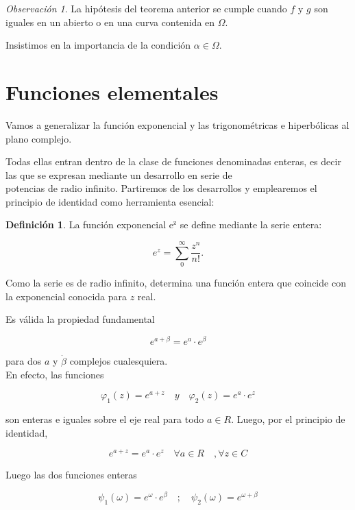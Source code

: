 \documentclass[10pt]{article}
\theoremstyle{plain}
\theoremstyle{definition}
\newtheorem{definition}[theorem]{Definición}
\theoremstyle{remark}
\newtheorem{remark}[theorem]{Observación}
\begin{document}
\begin{remark}
La hipótesis del teorema anterior se cumple cuando $f$ y $g$ son iguales en un abierto o en una curva contenida en $\Omega$.
\end{remark}


Insistimos en la importancia de la condición $\alpha \in \Omega$.

\section{Funciones elementales}
Vamos a generalizar la función exponencial y las trigonométricas e hiperbólicas al plano complejo.

Todas ellas entran dentro de la clase de funciones denominadas enteras, es decir las que se expresan mediante un desarrollo en serie de\\
potencias de radio infinito. Partiremos de los desarrollos y emplearemos el principio de identidad como herramienta esencial:

\begin{definition}
  La función exponencial $\mathrm{e}^{\mathrm{z}}$ se define mediante la serie entera:

  \begin{equation*}
  e^{z}=\sum_{0}^{\infty} \frac{z^{n}}{n!} . \tag{12-1}
  \end{equation*}
\end{definition}

Como la serie es de radio infinito, determina una función entera que coincide con la exponencial conocida para $z$ real.

Es válida la propiedad fundamental


\begin{equation*}
e^{a+\beta}=e^{a} \cdot e^{\beta} \tag{12-2}
\end{equation*}


para dos $a$ y $\dot{\beta}$ complejos cualesquiera.\\
En efecto, las funciones

$$
\varphi_{1}(z)=e^{a+z} \quad y \quad \varphi_{2}(z)=e^{a} \cdot e^{z}
$$

son enteras e iguales sobre el eje real para todo $a \in R$. Luego, por el principio de identidad,

$$
e^{a+z}=e^{a} \cdot e^{z} \quad \forall a \in R \quad, \forall z \in C
$$

Luego las dos funciones enteras

$$
\psi_{1}(\omega)=e^{\omega} \cdot e^{\beta} \quad ; \quad \psi_{2}(\omega)=e^{\omega+\beta}
$$
\end{document}
